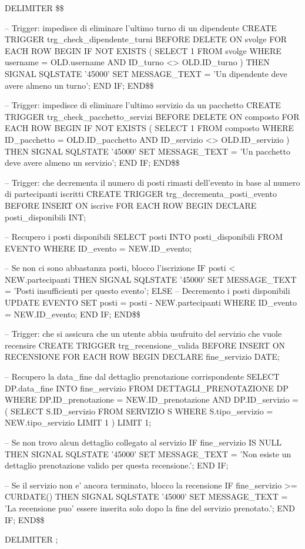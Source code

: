 \documentclass[a4paper,12pt]{report}
\begin{document}
\begin{sqlcode}[caption={TRIGGERS},label={lst:trigger}]

	DELIMITER \$\$

	-- Trigger: impedisce di eliminare l'ultimo turno di un dipendente
	CREATE TRIGGER trg_check_dipendente_turni
	BEFORE DELETE ON svolge
	FOR EACH ROW
	BEGIN
	IF NOT EXISTS (
	SELECT 1 FROM svolge
	WHERE username = OLD.username
	AND ID_turno <> OLD.ID_turno
	) THEN
	SIGNAL SQLSTATE '45000'
	SET MESSAGE_TEXT = 'Un dipendente deve avere almeno un turno';
	END IF;
	END\$\$

	-- Trigger: impedisce di eliminare l'ultimo servizio da un pacchetto
	CREATE TRIGGER trg_check_pacchetto_servizi
	BEFORE DELETE ON composto
	FOR EACH ROW
	BEGIN
	IF NOT EXISTS (
	SELECT 1 FROM composto
	WHERE ID_pacchetto = OLD.ID_pacchetto
	AND ID_servizio <> OLD.ID_servizio
	) THEN
	SIGNAL SQLSTATE '45000'
	SET MESSAGE\_TEXT = 'Un pacchetto deve avere almeno un servizio';
	END IF;
	END\$\$

	-- Trigger: che decrementa il numero di posti rimasti dell'evento in base al numero di partecipanti iscritti
	CREATE TRIGGER trg_decrementa_posti_evento
	BEFORE INSERT ON iscrive
	FOR EACH ROW
	BEGIN
	DECLARE posti_disponibili INT;

	-- Recupero i posti disponibili
	SELECT posti
	INTO posti_disponibili
	FROM EVENTO
	WHERE ID_evento = NEW.ID_evento;

	-- Se non ci sono abbastanza posti, blocco l'iscrizione
	IF posti < NEW.partecipanti THEN
	SIGNAL SQLSTATE '45000'
	SET MESSAGE_TEXT = 'Posti insufficienti per questo evento';
	ELSE
	-- Decremento i posti disponibili
	UPDATE EVENTO
	SET posti = posti - NEW.partecipanti
	WHERE ID_evento = NEW.ID_evento;
	END IF;
	END\$\$

	-- Trigger: che si assicura che un utente abbia usufruito del servizio che vuole recensire
	CREATE TRIGGER trg_recensione_valida
	BEFORE INSERT ON RECENSIONE
	FOR EACH ROW
	BEGIN
	DECLARE fine_servizio DATE;

	-- Recupero la data_fine dal dettaglio prenotazione corrispondente
	SELECT DP.data_fine
	INTO fine_servizio
	FROM DETTAGLI_PRENOTAZIONE DP
	WHERE DP.ID_prenotazione = NEW.ID_prenotazione
	AND DP.ID_servizio = (
	SELECT S.ID_servizio
	FROM SERVIZIO S
	WHERE S.tipo_servizio = NEW.tipo_servizio
	LIMIT 1
	)
	LIMIT 1;

	-- Se non trovo alcun dettaglio collegato al servizio
	IF fine_servizio IS NULL THEN
	SIGNAL SQLSTATE '45000'
	SET MESSAGE_TEXT = 'Non esiste un dettaglio prenotazione valido per questa recensione.';
	END IF;

	-- Se il servizio non e' ancora terminato, blocco la recensione
	IF fine_servizio >= CURDATE() THEN
	SIGNAL SQLSTATE '45000'
	SET MESSAGE_TEXT = 'La recensione puo' essere inserita solo dopo la fine del servizio prenotato.';
	END IF;
	END\$\$

	DELIMITER ;
\end{sqlcode}
\end{document}
